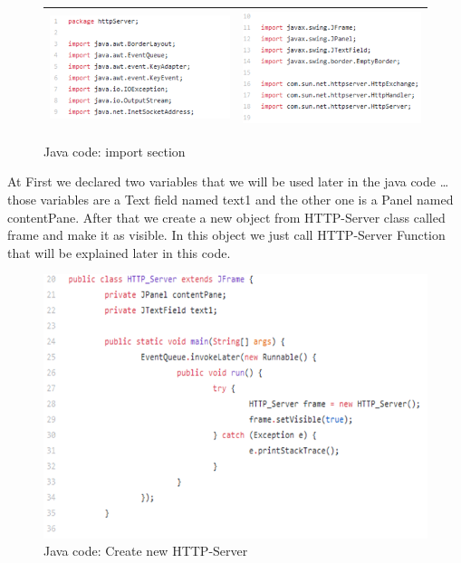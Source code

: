 \documentclass{article}
\begin{document}
\begin{figure}[h]
    \centering
\begin{tabular}{|c|c|}
    \hline
    \includegraphics[width=.6\textwidth]{figures/42.1.png} & \includegraphics[width=.6\textwidth]{figures/42.2.png}\\
    \hline
\end{tabular}
    \caption{Java code: import section}
    \label{fig:my_label}
\end{figure}


At First we declared two variables that we will be used later in the java code … those variables are a Text field named text1 and the other one is a Panel named contentPane.  After that we create a new object from HTTP-Server class called frame and make it as visible. In this object we just call HTTP-Server Function that will be explained later in this code.

\begin{figure}[h]
    \centering
    \includegraphics[width=.9\textwidth]{figures/43.png}
    \caption{Java code: Create new HTTP-Server}
    \label{fig:my_label}
\end{figure}
\end{document}
